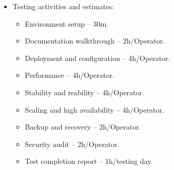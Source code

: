 \begin{itemize}
\begin{itemize}
          \item Testing activities and estimates:
                \begin{itemize}
                  \item Environment setup – 30m.
                  \item Documentation walkthrough – 2h/Operator.
                  \item Deployment and configuration – 4h/Operator.
                  \item Performance – 4h/Operator.
                  \item Stability and reability – 4h/Operator.
                  \item Scaling and high availability – 4h/Operator.
                  \item Backup and recovery – 2h/Operator.
                  \item Security audit – 2h/Operator.
                  \item Test completion report – 1h/testing day.
                \end{itemize}


\end{itemize}
\end{itemize}

